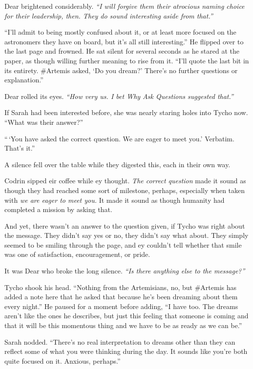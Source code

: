 Dear brightened considerably. \emph{``I will forgive them their atrocious naming choice for their leadership, then. They do sound interesting aside from that.''}

``I'll admit to being mostly confused about it, or at least more focused on the astronomers they have on board, but it's all still interesting.'' He flipped over to the last page and frowned. He sat silent for several seconds as he stared at the paper, as though willing further meaning to rise from it. ``I'll quote the last bit in its entirety. \#Artemis asked, `Do you dream?' There's no further questions or explanation.''

Dear rolled its eyes. \emph{``How very us. I bet Why Ask Questions suggested that.''}

If Sarah had been interested before, she was nearly staring holes into Tycho now. ``What was their answer?''

``\,`You have asked the correct question. We are eager to meet you.' Verbatim. That's it.''

A silence fell over the table while they digested this, each in their own way.

Codrin sipped eir coffee while ey thought. \emph{The correct question} made it sound as though they had reached some sort of milestone, perhaps, especially when taken with \emph{we are eager to meet you.} It made it sound as though humanity had completed a mission by asking that.

And yet, there wasn't an answer to the question given, if Tycho was right about the message. They didn't say yes or no, they didn't say what about. They simply seemed to be smiling through the page, and ey couldn't tell whether that smile was one of satisfaction, encouragement, or pride.

It was Dear who broke the long silence. \emph{``Is there anything else to the message?''}

Tycho shook his head. ``Nothing from the Artemisians, no, but \#Artemis has added a note here that he asked that because he's been dreaming about them every night.'' He paused for a moment before adding, ``I have too. The dreams aren't like the ones he describes, but just this feeling that someone is coming and that it will be this momentous thing and we have to be as ready as we can be.''

Sarah nodded. ``There's no real interpretation to dreams other than they can reflect some of what you were thinking during the day. It sounds like you're both quite focused on it. Anxious, perhaps.''

